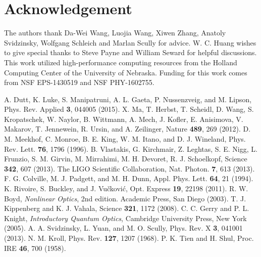 \documentclass[aps,prl,nobibnotes,nofootinbib,showpacs,reprint]{revtex4-1}
\begin{document}
\section{Acknowledgement}

The authors thank Da-Wei Wang, Luojia Wang, Xiwen Zhang, Anatoly Svidzinsky, Wolfgang Schleich and Marlan Scully for advice. W. C. Huang wishes to give special thanks to Steve Payne and William Seward for helpful discussions. This work utilized high-performance computing resources from the Holland Computing Center of the University of Nebraska. Funding for this work comes from NSF EPS-1430519 and NSF PHY-1602755.

\begin{thebibliography}{99}
	 A. Dutt, K. Luke, S. Manipatruni, A. L. Gaeta, P. Nussenzveig, and M. Lipson, Phys. Rev. Applied \textbf{3}, 044005 (2015). %
	 X. Ma, T. Herbst, T. Scheidl, D. Wang, S. Kropatschek, W. Naylor, B. Wittmann, A. Mech, J. Kofler, E. Anisimova, V. Makarov, T. Jennewein, R. Ursin, and A. Zeilinger, Nature \textbf{489}, 269 (2012).  %
	 D. M. Meekhof, C. Monroe, B. E. King, W. M. Itano, and D. J. Wineland, Phys. Rev. Lett. \textbf{76}, 1796 (1996). %
	 B. Vlastakis, G. Kirchmair, Z. Leghtas, S. E. Nigg, L. Frunzio, S. M. Girvin, M. Mirrahimi, M. H. Devoret, R. J. Schoelkopf, Science \textbf{342}, 607 (2013). %
	 The LIGO Scientific Collaboration, Nat. Photon. \textbf{7}, 613 (2013). 	%
	 F. G. Colville, M. J. Padgett, and M. H. Dunn, Appl. Phys. Lett. \textbf{64}, 21 (1994). %
	 K. Rivoire, S. Buckley, and J. Vu\v{c}kovi\'{c}, Opt. Express \textbf{19}, 22198 (2011). %
	 R. W. Boyd, \textit{Nonlinear Optics}, 2nd edition. Academic Press, San Diego (2003).  %
	 T. J. Kippenberg and K. J. Vahala, Science \textbf{321}, 1172 (2008).  %
	 C. C. Gerry and P. L. Knight, \textit{Introductory Quantum Optics}, Cambridge University Press, New York (2005). %
	 A. A. Svidzinsky, L. Yuan, and M. O. Scully, Phys. Rev. X \textbf{3}, 041001 (2013). %
	 N. M. Kroll, Phys. Rev. \textbf{127}, 1207 (1968). %
	 P. K. Tien and H. Shul, Proc. IRE \textbf{46}, 700 (1958). %

\end{thebibliography}
\end{document}
